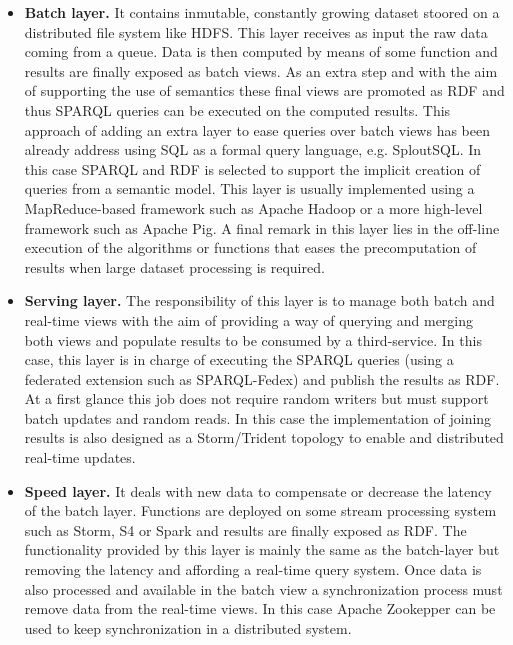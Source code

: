 \begin{itemize}
 \item \textbf{Batch layer.} It contains inmutable, constantly growing dataset stoored on a distributed file system like HDFS. This layer 
 receives as input the raw data coming from a queue. Data is then computed by means of some function and results are finally exposed 
 as batch views. As an extra step and with the aim of supporting the use of semantics these final views are promoted as RDF and thus SPARQL queries 
 can be executed on the computed results. This approach of adding an extra layer to ease queries over batch views has been 
 already address using SQL as a formal query language, e.g. SploutSQL. In this case SPARQL and RDF is selected to support the implicit 
 creation of queries from a semantic model. This layer is usually implemented using a MapReduce-based framework such as Apache Hadoop or 
 a more high-level framework such as Apache Pig. A final remark in this layer lies in the off-line execution of the algorithms or functions 
 that eases the precomputation of results when large dataset processing is required.
 
 \item \textbf{Serving layer.} The responsibility of this layer is to manage both batch and real-time views 
 with the aim of providing a way of querying and merging both views and populate results to be consumed by 
 a third-service. In this case, this layer is in charge of executing the SPARQL queries (using a federated extension 
 such as SPARQL-Fedex) and publish the results as RDF. At a first glance this job does not require 
 random writers but must support batch updates and random reads. In this case the implementation of joining 
 results is also designed as a Storm/Trident topology to enable and distributed real-time updates.

\item \textbf{Speed layer.} It deals with new data to compensate or decrease the latency of the batch layer. 
Functions are deployed on some stream processing system such as Storm, S4 or Spark and results are finally 
exposed as RDF. The functionality provided by this layer is mainly the same as the batch-layer but removing 
the latency and affording a real-time query system. Once data is also processed and available in the batch 
view a synchronization process must remove data from the real-time views. In this case Apache Zookepper 
can be used to keep synchronization in a distributed system.
\end{itemize}

